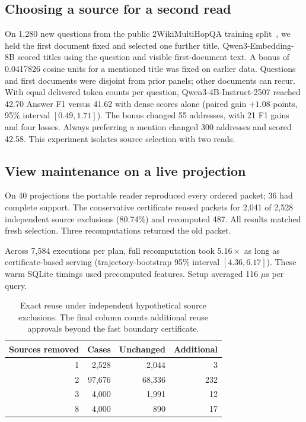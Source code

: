 \documentclass[conference]{IEEEtran}
\begin{document}
\subsection{Choosing a source for a second read}
On 1,280 new questions from the public 2WikiMultiHopQA training split~\cite{ho2wiki}, we held the first document fixed and selected one further title. Qwen3-Embedding-8B scored titles using the question and visible first-document text. A bonus of 0.0417826 cosine units for a mentioned title was fixed on earlier data. Questions and first documents were disjoint from prior panels; other documents can recur. With equal delivered token counts per question, Qwen3-4B-Instruct-2507 reached 42.70 Answer F1 versus 41.62 with dense scores alone (paired gain $+1.08$ points, 95\% interval $[0.49,1.71]$). The bonus changed 55 addresses, with 21 F1 gains and four losses. Always preferring a mention changed 300 addresses and scored 42.58. This experiment isolates source selection with two reads.

\subsection{View maintenance on a live projection}
On 40 projections the portable reader reproduced every ordered packet; 36 had complete support. The conservative certificate reused packets for 2,041 of 2,528 independent source exclusions (80.74\%) and recomputed 487. All results matched fresh selection. Three recomputations returned the old packet.

Across 7,584 executions per plan, full recomputation took $5.16\times$ as long as certificate-based serving (trajectory-bootstrap 95\% interval $[4.36,6.17]$). These warm SQLite timings used precomputed features. Setup averaged 116 $\mu$s per query. 

\balance
\begin{table}[t]
\caption{Exact reuse under independent hypothetical source exclusions. The final column counts additional reuse approvals beyond the fast boundary certificate.}
\centering\small
\begin{tabular}{rrrr}\toprule
Sources removed & Cases & Unchanged & Additional\\\midrule
1 & 2,528 & 2,044 & 3\\
2 & 97,676 & 68,336 & 232\\
3 & 4,000 & 1,991 & 12\\
8 & 4,000 & 890 & 17\\
\bottomrule\end{tabular}
\label{tab:exclusions}
\end{table}
\end{document}
